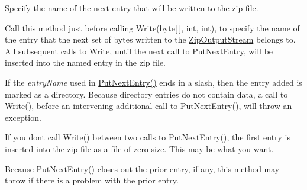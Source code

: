 Specify the name of the next entry that will be written to the zip file. 

Call this method just before calling Write(byte\mbox{[}$\,$\mbox{]}, int, int), to specify the name of the entry that the next set of bytes written to the {\ttfamily \mbox{\hyperlink{class_super_tiled2_unity_1_1_ionic_1_1_zip_1_1_zip_output_stream}{Zip\+Output\+Stream}}} belongs to. All subsequent calls to {\ttfamily Write}, until the next call to {\ttfamily Put\+Next\+Entry}, will be inserted into the named entry in the zip file. 

If the {\itshape entry\+Name}  used in {\ttfamily \mbox{\hyperlink{class_super_tiled2_unity_1_1_ionic_1_1_zip_1_1_zip_output_stream_a6328a636a423976167278aca779a3eca}{Put\+Next\+Entry()}}} ends in a slash, then the entry added is marked as a directory. Because directory entries do not contain data, a call to {\ttfamily \mbox{\hyperlink{class_super_tiled2_unity_1_1_ionic_1_1_zip_1_1_zip_output_stream_a8cd95df92691b8f266216f1d6984dfec}{Write()}}}, before an intervening additional call to {\ttfamily \mbox{\hyperlink{class_super_tiled2_unity_1_1_ionic_1_1_zip_1_1_zip_output_stream_a6328a636a423976167278aca779a3eca}{Put\+Next\+Entry()}}}, will throw an exception. 

If you don\textquotesingle{}t call {\ttfamily \mbox{\hyperlink{class_super_tiled2_unity_1_1_ionic_1_1_zip_1_1_zip_output_stream_a8cd95df92691b8f266216f1d6984dfec}{Write()}}} between two calls to {\ttfamily \mbox{\hyperlink{class_super_tiled2_unity_1_1_ionic_1_1_zip_1_1_zip_output_stream_a6328a636a423976167278aca779a3eca}{Put\+Next\+Entry()}}}, the first entry is inserted into the zip file as a file of zero size. This may be what you want. 

Because {\ttfamily \mbox{\hyperlink{class_super_tiled2_unity_1_1_ionic_1_1_zip_1_1_zip_output_stream_a6328a636a423976167278aca779a3eca}{Put\+Next\+Entry()}}} closes out the prior entry, if any, this method may throw if there is a problem with the prior entry. 


